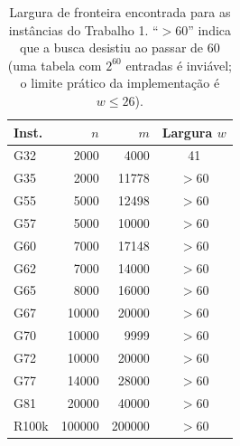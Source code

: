 \begin{table}[ht]\centering\small
\caption{Largura de fronteira encontrada para as inst\^ancias do Trabalho 1. ``$>60$'' indica que a busca desistiu ao passar de 60 (uma tabela com $2^{60}$ entradas \'e invi\'avel; o limite pr\'atico da implementa\c{c}\~ao \'e $w\le 26$).}\label{tab:largT1}
\begin{tabular}{lrrc}\hline Inst. & $n$ & $m$ & Largura $w$ \\\hline
G32 & 2000 & 4000 & 41 \\
G35 & 2000 & 11778 & $>$60 \\
G55 & 5000 & 12498 & $>$60 \\
G57 & 5000 & 10000 & $>$60 \\
G60 & 7000 & 17148 & $>$60 \\
G62 & 7000 & 14000 & $>$60 \\
G65 & 8000 & 16000 & $>$60 \\
G67 & 10000 & 20000 & $>$60 \\
G70 & 10000 & 9999 & $>$60 \\
G72 & 10000 & 20000 & $>$60 \\
G77 & 14000 & 28000 & $>$60 \\
G81 & 20000 & 40000 & $>$60 \\
R100k & 100000 & 200000 & $>$60 \\
\hline\end{tabular}\end{table}
